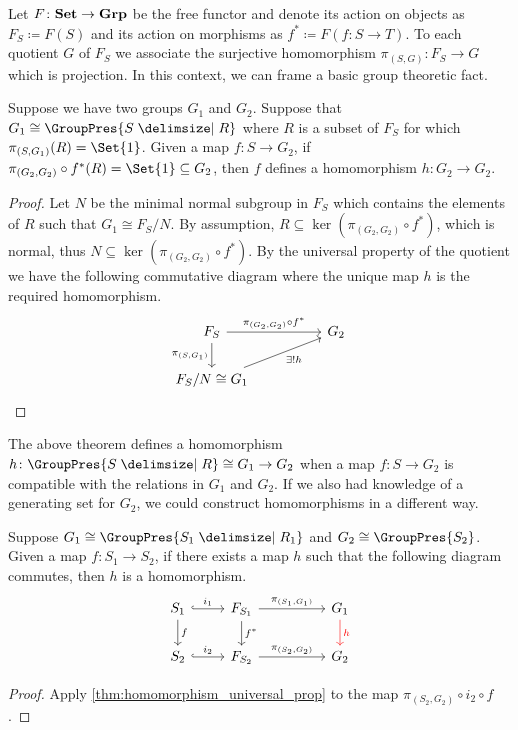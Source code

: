 Let $F \colon \mathbf{Set} \to \mathbf{Grp}$ be the free functor and denote its action on objects as $F_S \coloneqq F(S)$ and its action on morphisms as  $f^* \coloneqq F(f \colon S \to T)$. To each quotient $G$ of $F_S$ we associate the surjective homomorphism $\pi_{(S,G)} \colon F_S \to G$ which is projection. In this context, we can frame a basic group theoretic fact.

\begin{theorem}
	Suppose we have two groups $G_1$ and $G_2$. Suppose that $G_1 \cong \GroupPres{S \relations R}$ where $R$ is a subset of $F_S$ for which $\pi_{(S,G_1)}(R) = \Set{1}$.
	Given a map $f \colon S \to G_2$, if  $\pi_{(G_2, G_2)} \circ f^*(R) = \Set{1} \subseteq G_2$, then $f$ defines a homomorphism $h \colon G_2 \to G_2$.
	\label{thm:homomorphism_universal_prop}
\end{theorem}
\begin{proof}
	Let $N$ be the minimal normal subgroup in $F_{S}$ which contains the elements of $R$ such that $G_1 \cong F_{S}/N$.
	By assumption, $R \subseteq \ker(\pi_{(G_2,G_2)} \circ f^*)$, which is normal, thus $N \subseteq \ker(\pi_{(G_2,G_2)} \circ f^*)$.
	By the universal property of the quotient we have the following commutative diagram where the unique map $h$ is the required homomorphism.
	\begin{equation*}
		\begin{tikzcd}
			F_{S} \ar[rr, "\pi_{(G_2,G_2)} \circ f^*"] \ar[d, "\pi_{(S,G_1)}"'] & & G_2 \\
			F_{S}/N \cong G_1 \ar[rru, "\exists ! h"']
		\end{tikzcd}
	\end{equation*}
\end{proof}

The above theorem defines a homomorphism $h \colon \GroupPres{S \relations R} \cong G_1 \to G_2$ when a map $f \colon S \to G_2$ is compatible with the relations in $G_1$ and $G_2$.
If we also had knowledge of a generating set for $G_2$, we could construct homomorphisms in a different way.
\begin{theorem}
Suppose $G_1 \cong \GroupPres{S_1 \relations R_1}$ and $G_2 \cong \GroupPres{S_2}$.
Given a map $f \colon S_1 \to S_2$, if there exists a map  $h$ such that the following diagram commutes, then $h$ is a homomorphism.
\[
\begin{tikzcd}
	S_1 \ar[d, "f"] \ar[r, hook, "i_1"] & F_{S_1} \ar[d, "f^*"] \ar[rr, "\pi_{(S_1, G_1)}"] & & \ar[d, color=red, "h"] G_1 \\
	S_2 \ar[r, hook, "i_2"] & F_{S_2} \ar[rr, "\pi_{(S_2, G_2)}"] & & G_2
\end{tikzcd}
\]
\end{theorem}
\begin{proof}
	Apply \cref{thm:homomorphism_universal_prop} to the map $\pi_{(S_2, G_2)} \circ i_2 \circ f$.
\end{proof}

